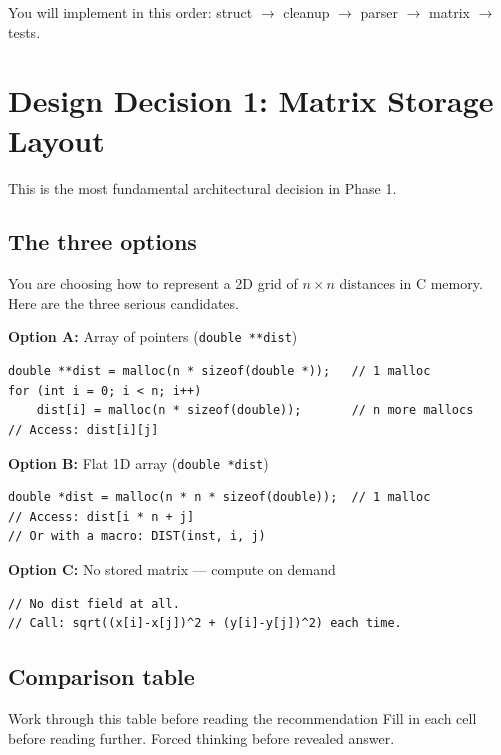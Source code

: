\documentclass[11pt]{article}
\begin{document}
You will implement in this order: struct $\to$ cleanup $\to$ parser $\to$ matrix $\to$ tests.

\newpage

\section{Design Decision 1: Matrix Storage Layout}

This is the most fundamental architectural decision in Phase 1.

\subsection{The three options}

You are choosing how to represent a 2D grid of $n \times n$ distances in C memory. Here are the three serious candidates.

\textbf{Option A:} Array of pointers (\texttt{double **dist})
\begin{lstlisting}[style=cstyle]
double **dist = malloc(n * sizeof(double *));   // 1 malloc
for (int i = 0; i < n; i++)
    dist[i] = malloc(n * sizeof(double));       // n more mallocs
// Access: dist[i][j]
\end{lstlisting}

\textbf{Option B:} Flat 1D array (\texttt{double *dist})
\begin{lstlisting}[style=cstyle]
double *dist = malloc(n * n * sizeof(double));  // 1 malloc
// Access: dist[i * n + j]
// Or with a macro: DIST(inst, i, j)
\end{lstlisting}

\textbf{Option C:} No stored matrix --- compute on demand
\begin{lstlisting}[style=cstyle]
// No dist field at all.
// Call: sqrt((x[i]-x[j])^2 + (y[i]-y[j])^2) each time.
\end{lstlisting}

\subsection{Comparison table}

\begin{inquiry}{Work through this table before reading the recommendation}
Fill in each cell before reading further. Forced thinking before revealed answer.
\end{inquiry}
\end{document}
